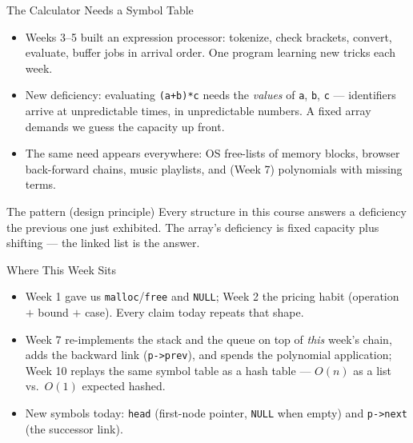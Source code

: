 \documentclass[aspectratio=169]{beamer}
\begin{document}
\begin{frame}{The Calculator Needs a Symbol Table}
  \begin{itemize}
    \item Weeks 3--5 built an expression processor: tokenize, check brackets,
      convert, evaluate, buffer jobs in arrival order. One program learning
      new tricks each week.
    \item New deficiency: evaluating \texttt{(a+b)*c} needs the \emph{values}
      of \texttt{a}, \texttt{b}, \texttt{c} --- identifiers arrive at
      unpredictable times, in unpredictable numbers. A fixed array demands we
      guess the capacity up front.
    \item The same need appears everywhere: OS free-lists of memory blocks,
      browser back-forward chains, music playlists, and (Week 7) polynomials
      with missing terms.
  \end{itemize}
  \begin{exampleblock}{The pattern (design principle)}
    Every structure in this course answers a deficiency the previous one just
    exhibited. The array's deficiency is fixed capacity plus shifting --- the
    linked list is the answer.
  \end{exampleblock}
\end{frame}

\begin{frame}{Where This Week Sits}
  \begin{itemize}
    \item Week 1 gave us \texttt{malloc}/\texttt{free} and \texttt{NULL};
      Week 2 the pricing habit (operation $+$ bound $+$ case). Every claim
      today repeats that shape.
    \item Week 7 re-implements the stack and the queue on top of \emph{this}
      week's chain, adds the backward link (\texttt{p->prev}), and spends the
      polynomial application; Week 10 replays the same symbol table as a hash
      table --- $O(n)$ as a list vs.\ $O(1)$ expected hashed.
    \item New symbols today: \texttt{head} (first-node pointer,
      \texttt{NULL} when empty) and \texttt{p->next} (the successor link).
  \end{itemize}
\end{frame}

\end{document}

